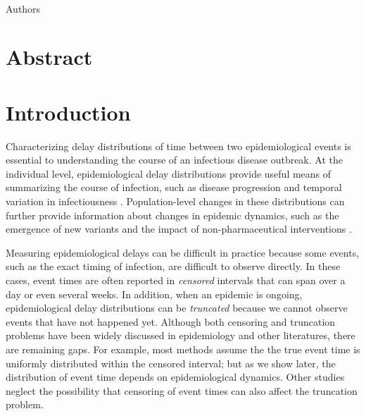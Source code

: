 \documentclass[12pt]{article}
\date{\today}
\begin{document}
\begin{flushleft}{
	\Large
	\textbf{}
}
\newline
\\
Authors
\bigskip

\bigskip

\section*{Abstract}

\end{flushleft}

\pagebreak

\section{Introduction}

Characterizing delay distributions of time between two epidemiological events is essential to understanding the course of an infectious disease outbreak.
At the individual level, epidemiological delay distributions provide useful means of summarizing the course of infection, such as disease progression \citep{lauer2020incubation,verity2020estimates} and temporal variation in infectiousness \citep{madewell2022serial}.
Population-level changes in these distributions can further provide information about changes in epidemic dynamics, such as the emergence of new variants and the impact of non-pharmaceutical interventions \citep{ali2020serial}.

Measuring epidemiological delays can be difficult in practice because some events, such as the exact timing of infection, are difficult to observe directly.
In these cases, event times are often reported in \emph{censored} intervals that can span over a day or even several weeks.
In addition, when an epidemic is ongoing, epidemiological delay distributions can be \emph{truncated} because we cannot observe events that have not happened yet.
Although both censoring and truncation problems have been widely discussed in epidemiology and other literatures, there are remaining gaps.
For example, most methods assume the the true event time is uniformly distributed within the censored interval;
but as we show later, the distribution of event time depends on epidemiological dynamics.
Other studies neglect the possibility that censoring of event times can also affect the truncation problem.
\end{document}
